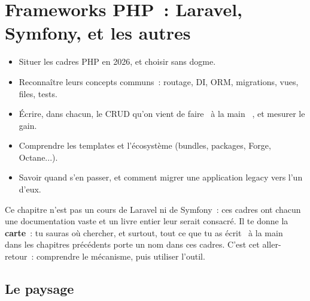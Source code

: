 \chapter{Frameworks PHP~: Laravel, Symfony, et les autres}
\label{ch-php-frameworks}

\begin{objectif}
\begin{itemize}
  \item Situer les cadres PHP en 2026, et choisir sans dogme.
  \item Reconna\^itre leurs concepts communs~: routage, DI, ORM, migrations, vues, files, tests.
  \item \'Ecrire, dans chacun, le CRUD qu'on vient de faire \og ~\`a la main~ \fg{}, et mesurer le gain.
  \item Comprendre les templates et l'\'ecosyst\`eme (bundles, packages, Forge, Octane...).
  \item Savoir quand s'en passer, et comment migrer une application legacy vers l'un d'eux.
\end{itemize}
\end{objectif}

\begin{note}
Ce chapitre n'est pas un cours de Laravel ni de Symfony~: ces cadres ont chacun une
documentation vaste et un livre entier leur serait consacr\'e. Il te donne la \textbf{carte}~:
tu sauras o\`u chercher, et surtout, tout ce que tu as \'ecrit \og ~\`a la main~ \fg{} dans les chapitres
pr\'ec\'edents porte un nom dans ces cadres. C'est cet aller-retour~: comprendre le m\'ecanisme,
puis utiliser l'outil.
\end{note}

\section{Le paysage}

